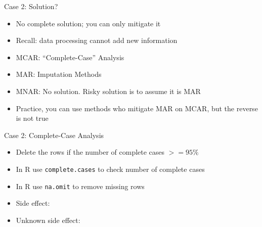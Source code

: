 \documentclass[ignorenonframetext,]{beamer}
\providecommand{\tightlist}{%
  \setlength{\itemsep}{0pt}\setlength{\parskip}{0pt}}
\begin{document}
\begin{frame}{Case 2: Solution?}

\begin{itemize}[<+->]
\tightlist
\item
  No complete solution; you can only mitigate it
\item
  Recall: data processing cannot add new information
\item
  MCAR: ``Complete-Case'' Analysis
\item
  MAR: Imputation Methods
\item
  MNAR: No solution. Risky solution is to assume it is MAR
\item
  Practice, you can use methods who mitigate MAR on MCAR, but the
  reverse is not true
\end{itemize}

\end{frame}

\begin{frame}[fragile]{Case 2: Complete-Case Analysis}

\begin{itemize}[<+->]
\tightlist
\item
  Delete the rows if the number of complete cases \(>=95\%\)
\item
  In R use \texttt{complete.cases} to check number of complete cases
\item
  In R use \texttt{na.omit} to remove missing rows
\item
  Side effect: \color{red}{waste of information}
\item
  Unknown side effect: \color{red}{introduces bias if MAR}
\end{itemize}

\end{frame}
\end{document}
